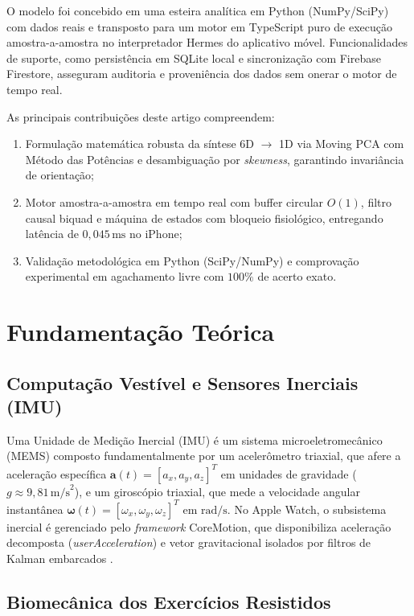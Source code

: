 \documentclass[12pt]{article}
\begin{document}
O modelo foi concebido em uma esteira analítica em Python (NumPy/SciPy) com dados reais e transposto para um motor em TypeScript puro de execução amostra-a-amostra no interpretador Hermes do aplicativo móvel. Funcionalidades de suporte, como persistência em SQLite local e sincronização com Firebase Firestore, asseguram auditoria e proveniência dos dados sem onerar o motor de tempo real.

As principais contribuições deste artigo compreendem:
\begin{enumerate}
    \setlength{\itemsep}{0pt}
    \setlength{\parskip}{0pt}
    \item Formulação matemática robusta da síntese 6D $\to$ 1D via Moving PCA com Método das Potências e desambiguação por \textit{skewness}, garantindo invariância de orientação;
    \item Motor amostra-a-amostra em tempo real com buffer circular $O(1)$, filtro causal biquad e máquina de estados com bloqueio fisiológico, entregando latência de $0{,}045\,\text{ms}$ no iPhone;
    \item Validação metodológica em Python (SciPy/NumPy) e comprovação experimental em agachamento livre com $100\%$ de acerto exato.
\end{enumerate}

\section{Fundamentação Teórica}

\subsection{Computação Vestível e Sensores Inerciais (IMU)}

Uma Unidade de Medição Inercial (IMU) é um sistema microeletromecânico (MEMS) composto fundamentalmente por um acelerômetro triaxial, que afere a aceleração específica $\mathbf{a}(t) = [a_x, a_y, a_z]^T$ em unidades de gravidade ($g \approx 9{,}81\,\text{m/s}^2$), e um giroscópio triaxial, que mede a velocidade angular instantânea $\boldsymbol{\omega}(t) = [\omega_x, \omega_y, \omega_z]^T$ em $\text{rad/s}$. No Apple Watch, o subsistema inercial é gerenciado pelo \textit{framework} CoreMotion, que disponibiliza aceleração decomposta (\textit{userAcceleration}) e vetor gravitacional isolados por filtros de Kalman embarcados \cite{bulling2014}.

\subsection{Biomecânica dos Exercícios Resistidos}
\end{document}
